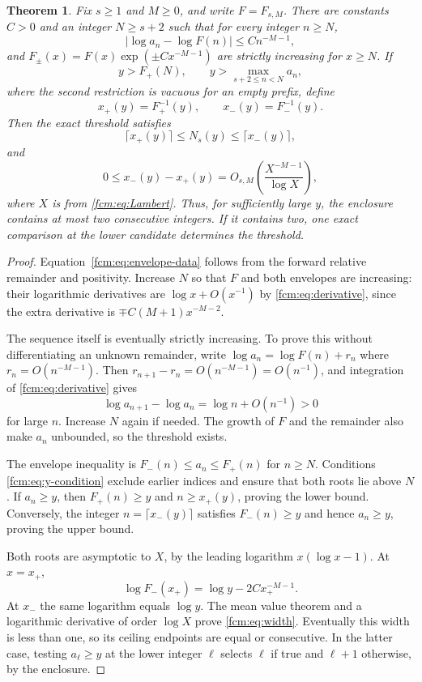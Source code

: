 \documentclass[11pt,letterpaper]{article}
\newtheorem{theorem}{Theorem}[section]
\theoremstyle{remark}\newtheorem{remark}[theorem]{Remark}
\begin{document}
\begin{theorem}\label{fcm:thm:threshold}
Fix $s\ge1$ and $M\ge0$, and write $F=F_{s,M}$. There are constants $C>0$ and an integer $N\ge s+2$ such that for every integer $n\ge N$,
\begin{equation}\label{fcm:eq:envelope-data}
 |\log a_n-\log F(n)|\le Cn^{-M-1},
\end{equation}
and $F_\pm(x)=F(x)\exp(\pm Cx^{-M-1})$ are strictly increasing for $x\ge N$. If
\begin{equation}\label{fcm:eq:y-condition}
 y>F_+(N),\qquad y>\max_{s+2\le n<N}a_n,
\end{equation}
where the second restriction is vacuous for an empty prefix, define
\[
 x_+(y)=F_+^{-1}(y),\qquad x_-(y)=F_-^{-1}(y).
\]
Then the exact threshold satisfies
\begin{equation}\label{fcm:eq:threshold}
 \lceil x_+(y)\rceil\le N_s(y)\le\lceil x_-(y)\rceil,
\end{equation}
and
\begin{equation}\label{fcm:eq:width}
 0\le x_-(y)-x_+(y)
 =O_{s,M}\left(\frac{X^{-M-1}}{\log X}\right),
\end{equation}
where $X$ is from \eqref{fcm:eq:Lambert}. Thus, for sufficiently large $y$, the enclosure contains at most two consecutive integers. If it contains two, one exact comparison at the lower candidate determines the threshold.
\end{theorem}
\begin{proof}
Equation~\eqref{fcm:eq:envelope-data} follows from the forward relative remainder and positivity. Increase $N$ so that $F$ and both envelopes are increasing: their logarithmic derivatives are $\log x+O(x^{-1})$ by \eqref{fcm:eq:derivative}, since the extra derivative is $\mp C(M+1)x^{-M-2}$.

The sequence itself is eventually strictly increasing. To prove this without differentiating an unknown remainder, write $\log a_n=\log F(n)+r_n$ where $r_n=O(n^{-M-1})$. Then $r_{n+1}-r_n=O(n^{-M-1})=O(n^{-1})$, and integration of \eqref{fcm:eq:derivative} gives
\[
 \log a_{n+1}-\log a_n=\log n+O(n^{-1})>0
\]
for large $n$. Increase $N$ again if needed. The growth of $F$ and the remainder also make $a_n$ unbounded, so the threshold exists.

The envelope inequality is $F_-(n)\le a_n\le F_+(n)$ for $n\ge N$. Conditions \eqref{fcm:eq:y-condition} exclude earlier indices and ensure that both roots lie above $N$. If $a_n\ge y$, then $F_+(n)\ge y$ and $n\ge x_+(y)$, proving the lower bound. Conversely, the integer $n=\lceil x_-(y)\rceil$ satisfies $F_-(n)\ge y$ and hence $a_n\ge y$, proving the upper bound.

Both roots are asymptotic to $X$, by the leading logarithm $x(\log x-1)$. At $x=x_+$,
\[
 \log F_-(x_+)=\log y-2Cx_+^{-M-1}.
\]
At $x_-$ the same logarithm equals $\log y$. The mean value theorem and a logarithmic derivative of order $\log X$ prove \eqref{fcm:eq:width}. Eventually this width is less than one, so its ceiling endpoints are equal or consecutive. In the latter case, testing $a_\ell\ge y$ at the lower integer $\ell$ selects $\ell$ if true and $\ell+1$ otherwise, by the enclosure.
\end{proof}
\end{document}

